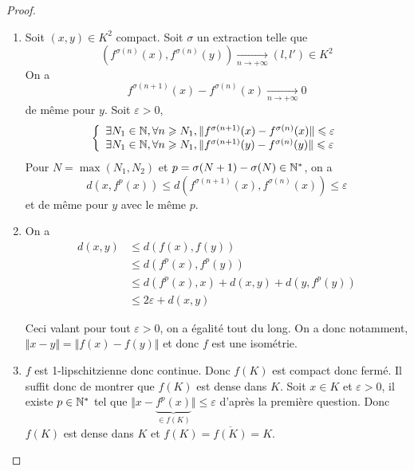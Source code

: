 \begin{proof}
	\phantom{}
	\begin{enumerate}
		\item 
		Soit $(x,y)\in K^{2}$ compact. Soit $\sigma$ un extraction telle que 
		\begin{equation}(f^{\sigma(n)}(x),f^{\sigma(n)}(y))\xrightarrow[n\to+\infty]{}(l,l')\in K^{2}\end{equation}
		On a 
		\begin{equation}f^{\sigma(n+1)}(x)-f^{\sigma(n)}(x)\xrightarrow[n\to+\infty]{}0\end{equation}
		de même pour $y$. Soit $\varepsilon>0$,
		\begin{equation}
		\left\{
			\begin{array}[]{l}
				\exists N_{1}\in\N,\forall n\geqslant N_{1},\Vert f^{\sigma(n+1)}(x)-f^{\sigma(n)}(x)\Vert\leqslant\varepsilon\\
			\exists N_{1}\in\N,\forall n\geqslant N_{1},\Vert f^{\sigma(n+1)}(y)-f^{\sigma(n)}(y)\Vert\leqslant\varepsilon
		\end{array}
		\right.
		\end{equation}
		Pour $N=\max(N_{1},N_{2})$ et $p=\sigma(N+1)-\sigma(N)\in\mathbb{N}^{*}$, on a 
		\begin{equation*}
			d(x,f^{p}(x))\leqslant d(f^{\sigma(n+1)}(x),f^{\sigma(n)}(x))\leqslant\varepsilon
		\end{equation*}
		et de même pour $y$ avec le même $p$.
	
		\item On a 
		\begin{align}
			d(x,y)
			&\leqslant d(f(x),f(y))\\
			&\leqslant d(f^{p}(x),f^{p}(y))\\
			&\leqslant d(f^{p}(x),x)+d(x,y)+d(y,f^{p}(y))\\
			&\leqslant 2\varepsilon+d(x,y)
		\end{align}

		Ceci valant pour tout $\varepsilon>0$, on a égalité tout du long. On a donc notamment, $\Vert x-y\Vert=\Vert f(x)-f(y)\Vert$ et donc $f$ est une isométrie.

		\item $f$ est 1-lipschitzienne donc continue. Donc $f(K)$ est compact donc fermé. Il suffit donc de montrer que $f(K)$ est dense dans $K$. Soit $x\in K$ et $\varepsilon>0$, il existe $p\in\mathbb{N}^{*}$ tel que $\Vert x-\underbrace{f^{p}(x)}_{\in f(K)}\Vert\leqslant\varepsilon$ d'après la première question. Donc $f(K)$ est dense dans $K$ et $f(K)=\overline{f(K)}=K$.
	\end{enumerate}
\end{proof}

